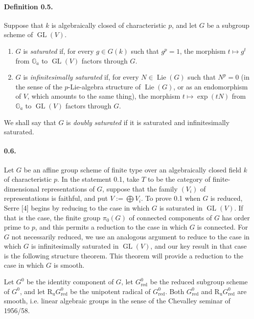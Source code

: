\documentclass[11pt]{article}
\newcommand{\Ga}{\mathbb{G}_a}
\newcommand{\Lie}{\operatorname{Lie}}
\newcommand{\GL}{\operatorname{GL}}
\newcommand{\Ru}{\operatorname{R_u}}
\newcommand{\red}{\mathrm{red}}
\theoremstyle{plain}
\theoremstyle{definition}
\begin{document}
\paragraph{Definition 0.5.} Suppose that $k$ is algebraically closed of characteristic $p$, and let $G$ be a subgroup scheme of $\GL(V)$.
\begin{enumerate}[label=(\roman*)]
\item $G$ is \emph{saturated} if, for every $g\in G(k)$ such that $g^p=1$, the morphism $t\mapsto g^t$ from $\Ga$ to $\GL(V)$ factors through $G$.
\item $G$ is \emph{infinitesimally saturated} if, for every $N\in\Lie(G)$ such that $N^p=0$ (in the sense of the $p$-Lie-algebra structure of $\Lie(G)$, or as an endomorphism of $V$, which amounts to the same thing), the morphism $t\mapsto\exp(tN)$ from $\Ga$ to $\GL(V)$ factors through $G$.
\end{enumerate}
We shall say that $G$ is \emph{doubly saturated} if it is saturated and infinitesimally saturated.

\paragraph{0.6.} Let $G$ be an affine group scheme of finite type over an algebraically closed field $k$ of characteristic $p$. In the statement 0.1, take $T$ to be the category of finite-dimensional representations of $G$, suppose that the family $(V_i)$ of representations is faithful, and put $V:=\bigoplus V_i$. To prove 0.1 when $G$ is reduced, Serre [4] begins by reducing to the case in which $G$ is saturated in $\GL(V)$. If that is the case, the finite group $\pi_0(G)$ of connected components of $G$ has order prime to $p$, and this permits a reduction to the case in which $G$ is connected. For $G$ not necessarily reduced, we use an analogous argument to reduce to the case in which $G$ is infinitesimally saturated in $\GL(V)$, and our key result in that case is the following structure theorem. This theorem will provide a reduction to the case in which $G$ is smooth.

Let $G^0$ be the identity component of $G$, let $G^0_{\red}$ be the reduced subgroup scheme of $G^0$, and let $\Ru G^0_{\red}$ be the unipotent radical of $G^0_{\red}$. Both $G^0_{\red}$ and $\Ru G^0_{\red}$ are smooth, i.e. linear algebraic groups in the sense of the Chevalley seminar of 1956/58.
\end{document}
